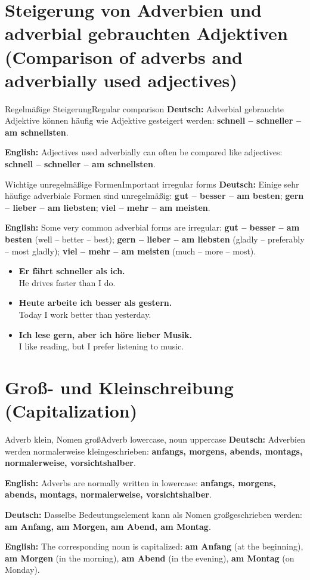\documentclass[a4paper,11pt]{article}
\newcommand{\GermanText}[1]{\textbf{Deutsch: }#1\par}
\newcommand{\EnglishText}[1]{{\small\color{SoftGray}\textbf{English: }#1\par}}
\newcommand{\ExampleItem}[2]{\item \textbf{#1}\\{\small\color{SoftGray}#2}}
\newcommand{\BSection}[2]{\section{#1 \textnormal{\small (#2)}}}
\begin{document}
\BSection{Steigerung von Adverbien und adverbial gebrauchten Adjektiven}{Comparison of adverbs and adverbially used adjectives}

\begin{grammarentry}{Regelmäßige Steigerung}{Regular comparison}
\GermanText{Adverbial gebrauchte Adjektive können häufig wie Adjektive gesteigert werden: \textbf{schnell -- schneller -- am schnellsten}.}
\EnglishText{Adjectives used adverbially can often be compared like adjectives: \textbf{schnell -- schneller -- am schnellsten}.}
\end{grammarentry}

\begin{grammarentry}{Wichtige unregelmäßige Formen}{Important irregular forms}
\GermanText{Einige sehr häufige adverbiale Formen sind unregelmäßig: \textbf{gut -- besser -- am besten}; \textbf{gern -- lieber -- am liebsten}; \textbf{viel -- mehr -- am meisten}.}
\EnglishText{Some very common adverbial forms are irregular: \textbf{gut -- besser -- am besten} (well -- better -- best); \textbf{gern -- lieber -- am liebsten} (gladly -- preferably -- most gladly); \textbf{viel -- mehr -- am meisten} (much -- more -- most).}
\end{grammarentry}

\begin{exbox}
\begin{itemize}
\ExampleItem{Er fährt schneller als ich.}{He drives faster than I do.}
\ExampleItem{Heute arbeite ich besser als gestern.}{Today I work better than yesterday.}
\ExampleItem{Ich lese gern, aber ich höre lieber Musik.}{I like reading, but I prefer listening to music.}
\end{itemize}
\end{exbox}

\BSection{Groß- und Kleinschreibung}{Capitalization}

\begin{grammarentry}{Adverb klein, Nomen groß}{Adverb lowercase, noun uppercase}
\GermanText{Adverbien werden normalerweise kleingeschrieben: \textbf{anfangs, morgens, abends, montags, normalerweise, vorsichtshalber}.}
\EnglishText{Adverbs are normally written in lowercase: \textbf{anfangs, morgens, abends, montags, normalerweise, vorsichtshalber}.}

\GermanText{Dasselbe Bedeutungselement kann als Nomen großgeschrieben werden: \textbf{am Anfang, am Morgen, am Abend, am Montag}.}
\EnglishText{The corresponding noun is capitalized: \textbf{am Anfang} (at the beginning), \textbf{am Morgen} (in the morning), \textbf{am Abend} (in the evening), \textbf{am Montag} (on Monday).}
\end{grammarentry}
\end{document}
